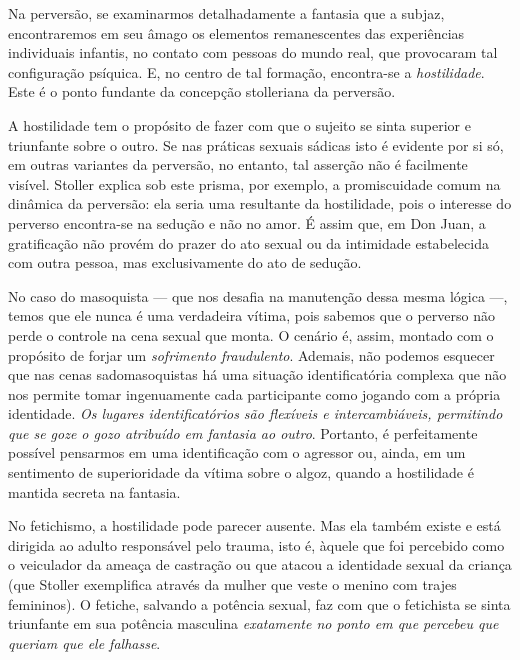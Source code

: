 Na perversão, se examinarmos detalhadamente a fantasia que a subjaz,
encontraremos em seu âmago os elementos remanescentes das experiências
individuais infantis, no contato com pessoas do mundo real, que provocaram
tal configuração psíquica. E, no centro de tal formação, encontra-se a
\textit{hostilidade}. Este é o ponto fundante da concepção stolleriana da
perversão.

A hostilidade tem o propósito de fazer com que o sujeito se sinta superior e
triunfante sobre o outro. Se nas práticas sexuais sádicas isto é evidente
por si só, em outras variantes da perversão, no entanto, tal asserção não é
facilmente visível. Stoller explica sob este prisma, por exemplo, a
promiscuidade comum na dinâmica da perversão: ela seria uma resultante da
hostilidade, pois o interesse do perverso encontra-se na sedução e não no
amor. É assim que, em Don Juan, a gratificação não provém do prazer do ato
sexual ou da intimidade estabelecida com outra pessoa, mas exclusivamente
do ato de sedução.

No caso do masoquista --- que nos desafia na manutenção dessa mesma lógica ---,
temos que ele nunca é uma verdadeira vítima, pois sabemos que o perverso
não perde o controle na cena sexual que monta. O cenário é, assim, montado
com o propósito de forjar um \textit{sofrimento fraudulento}. Ademais, não
podemos esquecer que nas cenas sadomasoquistas há uma situação
identificatória complexa que não nos permite tomar ingenuamente cada
participante como jogando com a própria identidade. \textit{Os lugares
identificatórios são flexíveis e intercambiáveis, permitindo que se goze o
gozo atribuído em fantasia ao outro}. Portanto, é perfeitamente possível
pensarmos em uma identificação com o agressor ou, ainda, em um sentimento
de superioridade da vítima sobre o algoz, quando a hostilidade é mantida
secreta na fantasia.

No fetichismo, a hostilidade pode parecer ausente. Mas ela também existe e
está dirigida ao adulto responsável pelo trauma, isto é, àquele que foi
percebido como o veiculador da ameaça de castração ou que atacou a
identidade sexual da criança (que Stoller exemplifica através da mulher que
veste o menino com trajes femininos). O fetiche, salvando a potência
sexual, faz com que o fetichista se sinta triunfante em sua potência
masculina \textit{exatamente no ponto em que percebeu que queriam que ele
falhasse}.

